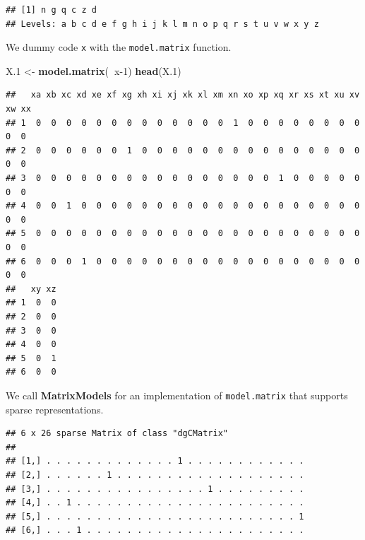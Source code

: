 \documentclass[]{book}
\newenvironment{Shaded}{\begin{snugshade}}{\end{snugshade}}
\newcommand{\CommentTok}[1]{\textcolor[rgb]{0.56,0.35,0.01}{\textit{#1}}}
\newcommand{\DecValTok}[1]{\textcolor[rgb]{0.00,0.00,0.81}{#1}}
\newcommand{\FloatTok}[1]{\textcolor[rgb]{0.00,0.00,0.81}{#1}}
\newcommand{\KeywordTok}[1]{\textcolor[rgb]{0.13,0.29,0.53}{\textbf{#1}}}
\newcommand{\NormalTok}[1]{#1}
\newcommand{\OperatorTok}[1]{\textcolor[rgb]{0.81,0.36,0.00}{\textbf{#1}}}
\newcommand{\StringTok}[1]{\textcolor[rgb]{0.31,0.60,0.02}{#1}}
\theoremstyle{definition}
\theoremstyle{definition}
\theoremstyle{definition}
\theoremstyle{remark}
\begin{document}
\begin{verbatim}
## [1] n g q c z d
## Levels: a b c d e f g h i j k l m n o p q r s t u v w x y z
\end{verbatim}

We dummy code \texttt{x} with the \texttt{model.matrix} function.

\begin{Shaded}
\begin{Highlighting}[]
\NormalTok{X}\FloatTok{.1}\NormalTok{ <-}\StringTok{ }\KeywordTok{model.matrix}\NormalTok{(}\OperatorTok{~}\NormalTok{x}\DecValTok{-1}\NormalTok{)}
\KeywordTok{head}\NormalTok{(X}\FloatTok{.1}\NormalTok{)}
\end{Highlighting}
\end{Shaded}

\begin{verbatim}
##   xa xb xc xd xe xf xg xh xi xj xk xl xm xn xo xp xq xr xs xt xu xv xw xx
## 1  0  0  0  0  0  0  0  0  0  0  0  0  0  1  0  0  0  0  0  0  0  0  0  0
## 2  0  0  0  0  0  0  1  0  0  0  0  0  0  0  0  0  0  0  0  0  0  0  0  0
## 3  0  0  0  0  0  0  0  0  0  0  0  0  0  0  0  0  1  0  0  0  0  0  0  0
## 4  0  0  1  0  0  0  0  0  0  0  0  0  0  0  0  0  0  0  0  0  0  0  0  0
## 5  0  0  0  0  0  0  0  0  0  0  0  0  0  0  0  0  0  0  0  0  0  0  0  0
## 6  0  0  0  1  0  0  0  0  0  0  0  0  0  0  0  0  0  0  0  0  0  0  0  0
##   xy xz
## 1  0  0
## 2  0  0
## 3  0  0
## 4  0  0
## 5  0  1
## 6  0  0
\end{verbatim}

We call \textbf{MatrixModels} for an implementation of \texttt{model.matrix} that supports sparse representations.

\begin{Shaded}
\end{Shaded}

\begin{verbatim}
## 6 x 26 sparse Matrix of class "dgCMatrix"
##                                                         
## [1,] . . . . . . . . . . . . . 1 . . . . . . . . . . . .
## [2,] . . . . . . 1 . . . . . . . . . . . . . . . . . . .
## [3,] . . . . . . . . . . . . . . . . 1 . . . . . . . . .
## [4,] . . 1 . . . . . . . . . . . . . . . . . . . . . . .
## [5,] . . . . . . . . . . . . . . . . . . . . . . . . . 1
## [6,] . . . 1 . . . . . . . . . . . . . . . . . . . . . .
\end{verbatim}
\end{document}
